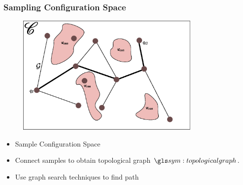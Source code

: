 \documentclass{beamer}
\begin{document}
	\begin{frame}
		\frametitle{Sampling Configuration Space}
		\begin{figure}
			\includegraphics[width=0.8\textwidth]{sampling_methods}
		\end{figure}

		\begin{itemize}
			\item

				Sample Configuration Space

			\item

				Connect samples to obtain topological graph $\topologicalgraph$.

			\item

				Use graph search techniques to find path
		\end{itemize}
	\end{frame}
\end{document}
